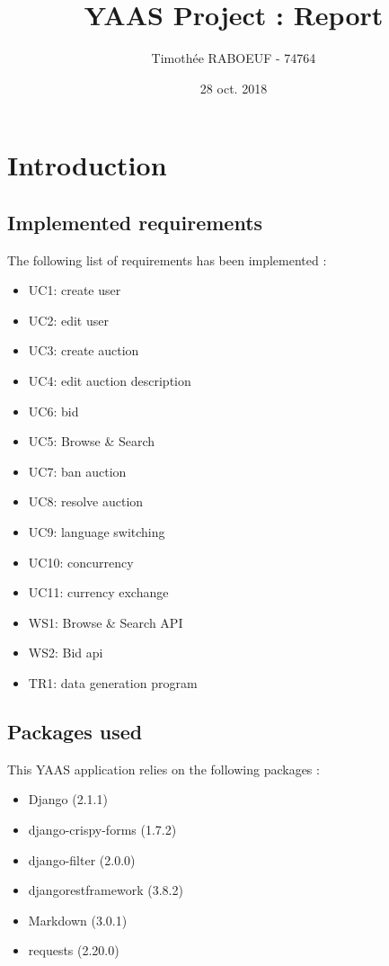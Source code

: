 \documentclass[a4paper, 11pt]{report}
\title{YAAS Project : Report}
\author{Timothée RABOEUF - 74764}
\date{28 oct. 2018}
\begin{document}
 
\maketitle
\tableofcontents
    
\chapter{Introduction}

    \section{Implemented requirements}

    The following list of requirements has been implemented : 
    \begin{itemize}
        \item UC1: create user
        \item UC2: edit user
        \item UC3: create auction
        \item UC4: edit auction description
        \item UC6: bid
        \item UC5: Browse \& Search
        \item UC7: ban auction
        \item UC8: resolve auction
        \item UC9: language switching
        \item UC10: concurrency
        \item UC11: currency exchange
        \item WS1: Browse \& Search API
        \item WS2: Bid api
        \item TR1: data generation program

    \end{itemize}

    \section{Packages used}
    This YAAS application relies on the following packages :
    \begin{itemize}
        \item Django (2.1.1)
        \item django-crispy-forms (1.7.2)
        \item django-filter (2.0.0) 
        \item djangorestframework (3.8.2)
        \item Markdown (3.0.1)
        \item requests (2.20.0)
        
    \end{itemize}
\end{document}
